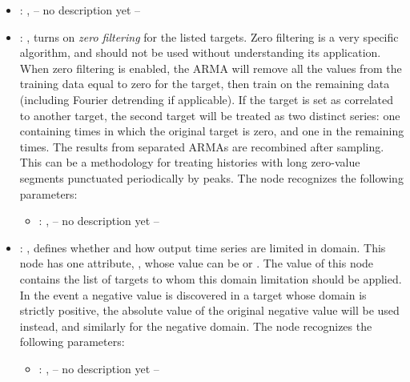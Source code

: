 \begin{itemize}
    \item {}: ,
      -- no description yet --

    \item {}: ,
      turns on \emph{zero filtering}                                                  for the listed
      targets. Zero filtering is a very specific algorithm, and should not be used without
      understanding its application.  When zero filtering is enabled, the ARMA will remove all the
      values from                                                  the training data equal to zero
      for the target, then train on the remaining data (including Fourier detrending
      if applicable). If the target is set as correlated to another target, the second target will
      be treated as                                                  two distinct series: one
      containing times in which the original target is zero, and one in the remaining
      times. The results from separated ARMAs are recombined after sampling. This can be a
      methodology for                                                  treating histories with long
      zero-value segments punctuated periodically by peaks.
      The  node recognizes the following parameters:
        \begin{itemize}
          \item {}: ,
            -- no description yet --
      \end{itemize}

    \item {}: ,
      defines whether and how output                                                    time series
      are limited in domain. This node has one attribute, , whose value can be
       or . The value of this node contains the list of
      targets to whom                                                    this domain limitation
      should be applied. In the event a negative value is discovered in a target whose
      domain is strictly positive, the absolute value of the original negative value will be used
      instead, and                                                    similarly for the negative
      domain.
      The  node recognizes the following parameters:
        \begin{itemize}
          \item {}: ,
            -- no description yet --
      \end{itemize}
  \end{itemize}

